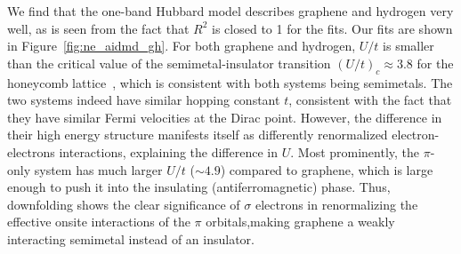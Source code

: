 \documentclass[aps, prb, 11pt]{revtex4-1}
\begin{document}
We find that the one-band Hubbard model describes graphene and hydrogen very well, as is seen from the fact that $R^2$ is closed to 1 for the fits. Our fits are shown in Figure~\ref{fig:ne_aidmd_gh}.
For both graphene and hydrogen, $U/t$ is smaller than the critical value of the 
semimetal-insulator transition $(U/t)_c \approx 3.8$ for the honeycomb lattice~\cite{Sorella2012}, 
which is consistent with both systems being semimetals. The two systems indeed have similar hopping constant $t$, 
consistent with the fact that they have similar Fermi velocities at the Dirac point. However, 
the difference in their high energy structure manifests itself as differently renormalized electron-electrons interactions, 
explaining the difference in $U$. Most prominently, the $\pi$-only system has much larger $U/t$ ($\sim4.9$) compared to graphene, 
which is large enough to push it into the insulating (antiferromagnetic) phase.
Thus, downfolding shows the clear significance of $\sigma$ electrons in renormalizing the effective onsite interactions of the $\pi$ orbitals,making graphene a weakly interacting semimetal instead of an insulator.  
\end{document}
